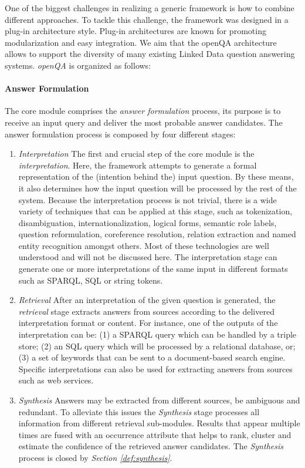 One of the biggest challenges in realizing a generic framework is how to combine different approaches.
To tackle this challenge, the framework was designed in a plug-in architecture style.
Plug-in architectures are known for promoting modularization and easy integration.
We aim that the openQA architecture allows to support the diversity of many existing Linked Data question answering systems. %
\emph{openQA} is organized as follows:
\vspace{-4.0mm}
\paragraph{\textbf{Answer Formulation}} The core module comprises the \emph{answer formulation} process, its purpose is to receive an input query and deliver the most probable answer candidates.
The answer formulation process is composed by four different stages:
\vspace{-3.0mm}
\begin{enumerate}
	\item \emph{Interpretation} The first and crucial step of the core module is the \emph{interpretation}. 
	Here, the framework attempts to generate a formal representation of the (intention behind the) input question.
	By these means, it also determines how the input question will be processed by the rest of the system.	
	Because the interpretation process is not trivial, there is a wide variety of techniques that can be applied at this stage, such as tokenization, disambiguation, internationalization, logical forms, semantic role labels, question reformulation, coreference resolution, relation extraction and named entity recognition amongst others.
	Most of these technologies are well understood and will not be discussed here.
	The interpretation stage can generate one or more interpretations of the same input in different formats such as SPARQL, SQL or string tokens.
	\item \emph{Retrieval} After an interpretation of the given question is generated, the \emph{retrieval} stage extracts answers from sources according to the delivered interpretation format or content.
	For instance, one of the outputs of the interpretation can be: 
	(1) a SPARQL query which can be handled by a triple store;
	(2) an SQL query which will be processed by a relational database, or;
	(3) a set of keywords that can be sent to a document-based search engine.
	Specific interpretations can also be used for extracting answers from sources such as web services.		
	\item \emph{Synthesis} %
	Answers may be extracted from different sources, be ambiguous and redundant.
	To alleviate this issues the \emph{Synthesis} stage processes all information from different retrieval sub-modules.
	Results that appear multiple times are fused with an occurrence attribute that helps to rank, cluster and estimate the confidence of the retrieved answer candidates.
	The \emph{Synthesis} process is closed by \textit{Section \ref{def:synthesis}}.

\end{enumerate}
